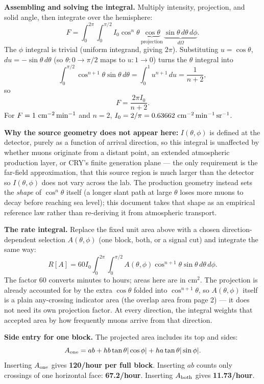 \documentclass[11pt,a4paper]{article}
\newcommand{\note}[1]{\par\noindent\colorbox{pale}{\parbox{\dimexpr\linewidth-2\fboxsep\relax}{\vspace{4pt}#1\vspace{4pt}}}\par}
\begin{document}
\textbf{Assembling and solving the integral.} Multiply intensity, projection,
and solid angle, then integrate over the hemisphere:
\[
F=\int_0^{2\pi}\!\!\int_0^{\pi/2}
 I_0\cos^n\theta\,\underbrace{\cos\theta}_{\text{projection}}\,
 \underbrace{\sin\theta\,d\theta\,d\phi}_{d\Omega}.
\]
The $\phi$ integral is trivial (uniform integrand, giving $2\pi$). Substituting
$u=\cos\theta$, $du=-\sin\theta\,d\theta$ (so $\theta:0\to\pi/2$ maps to
$u:1\to0$) turns the $\theta$ integral into
\[
\int_0^{\pi/2}\cos^{n+1}\theta\sin\theta\,d\theta
=\int_0^1 u^{n+1}\,du=\frac{1}{n+2},
\]
so
\[
\boxed{F=\frac{2\pi I_0}{n+2}.}
\]
For $F=1\ {\rm cm^{-2}\,min^{-1}}$ and $n=2$,
$I_0=2/\pi=0.63662\ {\rm cm^{-2}\,min^{-1}\,sr^{-1}}$.

\note{\textbf{Why the source geometry does not appear here:} $I(\theta,\phi)$ is
defined at the detector, purely as a function of arrival direction, so this
integral is unaffected by whether muons originate from a distant point, an
extended atmospheric production layer, or CRY's finite generation plane --- the
only requirement is the far-field approximation, that this source region is
much larger than the detector so $I(\theta,\phi)$ does not vary across the lab.
The production geometry instead sets the \emph{shape} of $\cos^n\theta$ itself
(a longer slant path at large $\theta$ loses more muons to decay before reaching
sea level); this document takes that shape as an empirical reference law rather
than re-deriving it from atmospheric transport.}

\textbf{The rate integral.} Replace the fixed unit area above with a chosen
direction-dependent selection $A(\theta,\phi)$ (one block, both, or a signal
cut) and integrate the same way:
\[
\boxed{R[A]=60I_0\int_0^{2\pi}\!\!\int_0^{\pi/2}
 A(\theta,\phi)\cos^{n+1}\theta\sin\theta\,d\theta\,d\phi.}
\]
The factor 60 converts minutes to hours; areas here are in cm$^2$. The
projection is already accounted for by the extra $\cos\theta$ folded into
$\cos^{n+1}\theta$, so $A(\theta,\phi)$ itself is a plain any-crossing indicator
area (the overlap area from page 2) --- it does not need its own projection
factor. At every direction, the integral weights that accepted area by how
frequently muons arrive from that direction.

\textbf{Side entry for one block.} The projected area includes its top and sides:
\[
A_{\rm one}=ab+hb\tan\theta|\cos\phi|+ha\tan\theta|\sin\phi|.
\]
Inserting $A_{\rm one}$ gives \textbf{120/hour per full block}. Inserting $ab$
counts only crossings of one horizontal face: \textbf{67.2/hour}.
Inserting $A_{\rm both}$ gives \textbf{11.73/hour}.
\end{document}
